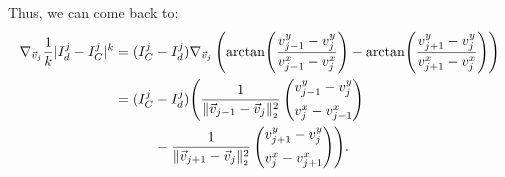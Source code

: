 \begin{proposition}
	Thus, we can come back to: 
	\begin{align*}
		\nabla_{\vec{v}_j} \frac{1}{k}| I^{j}_d - I^{j}_{C} |^k 
		&= (I^j_{C} - I^{j}_d) \nabla_{\vec{v}_j} \left(\arctan\!\left(\frac{v_{j-1}^{y} - v_{j}^{y}}{v_{j-1}^{x} - v_{j}^{x}}\right) - \arctan\!\left(\frac{v_{j+1}^{y} - v_{j}^{y}}{v_{j+1}^{x} - v_{j}^{x}}\right)\right) \\
		&= (I^j_{C} - I^{j}_d) \Biggl( 
		  \frac{1}{\norm[\vec{v}_{j-1} - \vec{v}_j]^2} \begin{pmatrix}
			v_{j-1}^{y} - v_{j}^{y} \\[0.5em]
			v_{j}^{x} - v_{j-1}^{x}
		\end{pmatrix} \\
		&\hspace{1cm} - \frac{1}{\norm[\vec{v}_{j+1} - \vec{v}_j]^2} \begin{pmatrix}
			v_{j+1}^{y} - v_{j}^{y} \\[0.5em]
			v_{j}^{x} - v_{j+1}^{x}
		\end{pmatrix} \Biggr).
	\end{align*}


\end{proposition}
